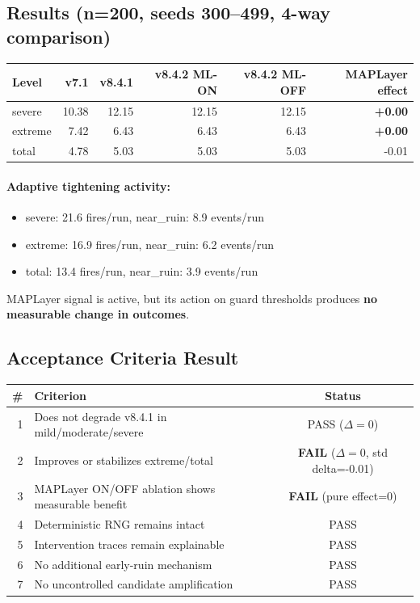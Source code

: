 \documentclass[11pt,a4paper]{article}
\begin{document}
\subsection{Results (n=200, seeds 300--499, 4-way comparison)}

\begin{tabular}{lrrrrr}
\toprule
\textbf{Level} & \textbf{v7.1} & \textbf{v8.4.1} & \textbf{v8.4.2 ML-ON} & \textbf{v8.4.2 ML-OFF} & \textbf{MAPLayer effect} \\
\midrule
severe  & 10.38 & 12.15 & 12.15 & 12.15 & \textbf{+0.00} \\
extreme & 7.42  & 6.43  & 6.43  & 6.43  & \textbf{+0.00} \\
total   & 4.78  & 5.03  & 5.03  & 5.03  & -0.01 \\
\bottomrule
\end{tabular}

\paragraph{Adaptive tightening activity:}
\begin{itemize}
  \item severe: 21.6 fires/run, near\_ruin: 8.9 events/run
  \item extreme: 16.9 fires/run, near\_ruin: 6.2 events/run
  \item total: 13.4 fires/run, near\_ruin: 3.9 events/run
\end{itemize}

MAPLayer signal is active, but its action on guard thresholds produces \textbf{no measurable change in outcomes}.

\subsection{Acceptance Criteria Result}

\begin{tabular}{rlc}
\toprule
\# & Criterion & Status \\
\midrule
1 & Does not degrade v8.4.1 in mild/moderate/severe & PASS ($\Delta=0$) \\
2 & Improves or stabilizes extreme/total & \textbf{FAIL} ($\Delta=0$, std delta=-0.01) \\
3 & MAPLayer ON/OFF ablation shows measurable benefit & \textbf{FAIL} (pure effect=0) \\
4 & Deterministic RNG remains intact & PASS \\
5 & Intervention traces remain explainable & PASS \\
6 & No additional early-ruin mechanism & PASS \\
7 & No uncontrolled candidate amplification & PASS \\
\bottomrule
\end{tabular}
\end{document}
